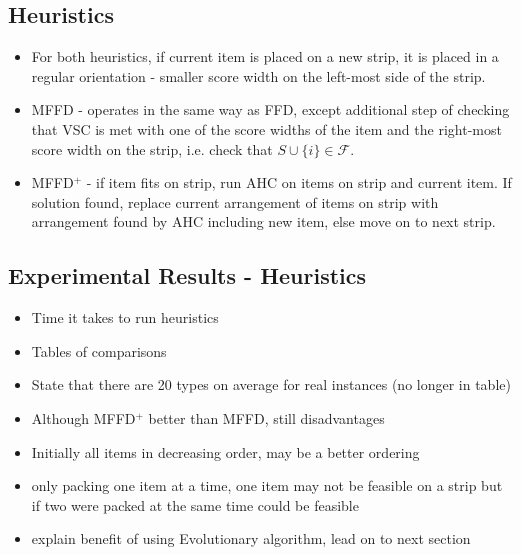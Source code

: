 \documentclass{elsarticle}
\begin{document}
\subsection{Heuristics}
\begin{itemize}
	\item For both heuristics, if current item is placed on a new strip, it is placed in a regular orientation - smaller score width on the left-most side of the strip.
	\item MFFD - operates in the same way as FFD, except additional step of checking that VSC is met with one of the score widths of the item and the right-most score width on the strip, i.e. check that $S \cup \{i\} \in \mathcal{F}$.
	\item MFFD$^+$ - if item fits on strip, run AHC on items on strip and current item. If solution found, replace current arrangement of items on strip with arrangement found by AHC including new item, else move on to next strip.
\end{itemize}

\subsection{Experimental Results - Heuristics}
\begin{itemize}
	\item Time it takes to run heuristics
	\item Tables of comparisons
	\item State that there are 20 types on average for real instances (no longer in table)
	\item Although MFFD$^+$ better than MFFD, still disadvantages
	\item Initially all items in decreasing order, may be a better ordering
	\item only packing one item at a time, one item may not be feasible on a strip but if two were packed at the same time could be feasible
	\item explain benefit of using Evolutionary algorithm, lead on to next section
\end{itemize}
\end{document}
